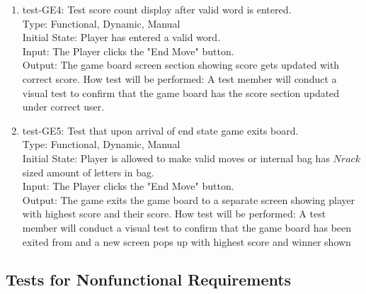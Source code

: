 \documentclass[12pt, titlepage]{article}
\begin{document}
\begin{enumerate}
    \item{test-GE4: Test score count display after valid word is entered.\\} %
    Type: Functional, Dynamic, Manual\\
    Initial State: Player has entered a valid word. \\
    Input: The Player clicks the "End Move" button.\\
    Output: The game board screen section showing score gets updated with correct score.
    How test will be performed: A test member will conduct a visual test to confirm that the game board has the score section updated under correct user.\\
    
    \item{test-GE5: Test that upon arrival of end state game exits board.\\} %
    Type: Functional, Dynamic, Manual\\
    Initial State: Player is allowed to make valid moves or internal bag has $N rack$ sized amount of letters in bag. \\
    Input: The Player clicks the "End Move" button.\\
    Output: The game exits the game board to a separate screen showing player with highest score and their score.
    How test will be performed: A test member will conduct a visual test to confirm that the game board has been exited from and a new screen pops up with highest score and winner shown\\
\end{enumerate}
    
\subsection{Tests for Nonfunctional Requirements}%
\end{document}
